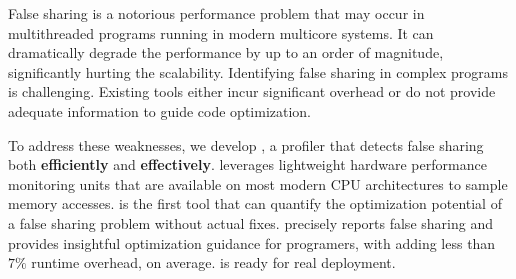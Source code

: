 
False sharing is a notorious performance problem that may occur in multithreaded programs running in modern multicore systems. It can dramatically degrade the performance by up to an order of magnitude, significantly hurting the scalability. Identifying false sharing in complex programs is challenging. Existing tools either incur significant overhead or do not provide adequate information to guide code optimization.

\sloppy
To address these weaknesses, we develop \cheetah{}, a profiler that detects false sharing both {\bf efficiently} and {\bf effectively}. \cheetah{} leverages lightweight hardware performance monitoring units that are available on most modern CPU architectures to sample memory accesses. \cheetah{} is the first tool that can quantify the optimization potential of a false sharing problem without actual fixes. \cheetah{} precisely reports false sharing and provides insightful optimization guidance for programers, with adding less than $7\%$ runtime overhead, on average. \Cheetah{} is ready for real deployment. 


